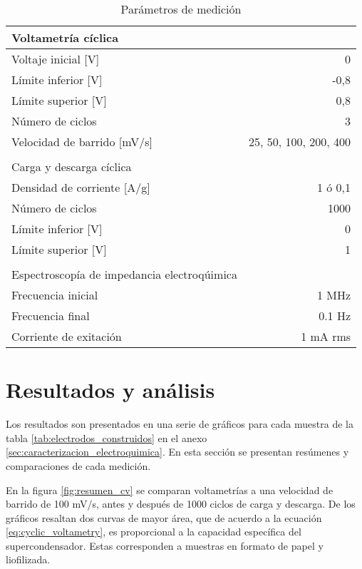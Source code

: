 \begin{table}[h!]
	\centering
	\caption{Parámetros de medición}
	\begin{tabular}{ l r }
		Voltametría cíclica &  \\
		\hline
		Voltaje inicial [V] & 0 \\
		Límite inferior [V] & -0,8 \\
		Límite superior [V] & 0,8  \\
		Número de ciclos & 3 \\
		Velocidad de barrido [mV/s] & 25, 50, 100, 200, 400 \\
		& \\
		Carga y descarga cíclica & \\
		\hline
		Densidad de corriente [A/g] & 1 ó 0,1 \\
		Número de ciclos & 1000 \\
		Límite inferior [V] & 0 \\
		Límite superior [V] & 1 \\
		& \\
		Espectroscopía de impedancia electroqúimica & \\
		\hline
		Frecuencia inicial	&	1 MHz \\
		Frecuencia final	&	0.1 Hz \\
		Corriente de exitación & 1 mA rms \\ 
	\end{tabular}
	\label{tab:elec_config}
\end{table}

\section{Resultados y análisis}
Los resultados son presentados en una serie de gráficos para cada muestra de la tabla \ref{tab:electrodos_construidos} en el anexo \ref{sec:caracterizacion_electroquimica}. En esta sección se presentan resúmenes y comparaciones de cada medición.

En la figura \ref{fig:resumen_cv} se comparan voltametrías a una velocidad de barrido de 100 mV/s, antes y después de 1000 ciclos de carga y descarga. De los gráficos resaltan dos curvas de mayor área, que de acuerdo a la ecuación \ref{eq:cyclic_voltametry}, es proporcional a la capacidad específica del supercondensador. Estas corresponden a muestras en formato de papel y liofilizada.

